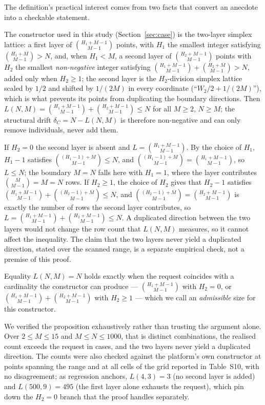 \documentclass{SCIS2026}
\begin{document}
The definition's practical interest comes from two facts that convert an anecdote into a checkable statement.

\begin{proposition}\label{prop:exact}
The constructor used in this study (Section~\ref{sec:case}) is the two-layer simplex lattice: a first layer of $\binom{H_1+M-1}{M-1}$ points, with $H_1$ the smallest integer satisfying $\binom{H_1+M}{M-1}>N$, and, when $H_1<M$, a second layer of $\binom{H_2+M-1}{M-1}$ points with $H_2$ the smallest \emph{non-negative} integer satisfying $\binom{H_1+M-1}{M-1}+\binom{H_2+M}{M-1}>N$, added only when $H_2\ge1$; the second layer is the $H_2$-division simplex lattice scaled by $1/2$ and shifted by $1/(2M)$ in every coordinate (``$W_2/2+1/(2M)$''), which is what prevents its points from duplicating the boundary directions. Then $L(N,M)=\binom{H_1+M-1}{M-1}+\binom{H_2+M-1}{M-1}\le N$ for all $M\ge2$, $N\ge M$; the structural drift $\delta_C = N - L(N,M)$ is therefore non-negative and can only remove individuals, never add them.
\end{proposition}

\proof If $H_2=0$ the second layer is absent and $L=\binom{H_1+M-1}{M-1}$. By the choice of $H_1$, $H_1-1$ satisfies $\binom{(H_1-1)+M}{M-1}\le N$, and $\binom{(H_1-1)+M}{M-1}=\binom{H_1+M-1}{M-1}$, so $L\le N$; the boundary $M=N$ falls here with $H_1=1$, where the layer contributes $\binom{M}{M-1}=M=N$ rows. If $H_2\ge1$, the choice of $H_2$ gives that $H_2-1$ satisfies $\binom{H_1+M-1}{M-1}+\binom{(H_2-1)+M}{M-1}\le N$, and $\binom{(H_2-1)+M}{M-1}=\binom{H_2+M-1}{M-1}$ is exactly the number of rows the second layer contributes, so $L=\binom{H_1+M-1}{M-1}+\binom{H_2+M-1}{M-1}\le N$. A duplicated direction between the two layers would not change the row count that $L(N,M)$ measures, so it cannot affect the inequality. The claim that the two layers never yield a duplicated direction, stated over the scanned range, is a separate empirical check, not a premise of this proof.

Equality $L(N,M)=N$ holds exactly when the request coincides with a cardinality the constructor can produce --- $\binom{H_1+M-1}{M-1}$ with $H_2=0$, or $\binom{H_1+M-1}{M-1}+\binom{H_2+M-1}{M-1}$ with $H_2\ge1$ --- which we call an \emph{admissible} size for this constructor.

We verified the proposition exhaustively rather than trusting the argument alone. Over $2\le M\le 15$ and $M\le N\le 1000$, that is \retCombos{} distinct combinations, the realised count exceeds the request in \retExceed{} cases, and the two layers never yield a duplicated direction. The counts were also checked against the platform's own constructor at \nProbedDirect{} points spanning the range and at all \nGridCells{} cells of the grid reported in Table~S10, with no disagreement; as regression anchors, $L(4,3)=3$ (no second layer is added) and $L(500,9)=495$ (the first layer alone exhausts the request), which pin down the $H_2=0$ branch that the proof handles separately.
\end{document}

